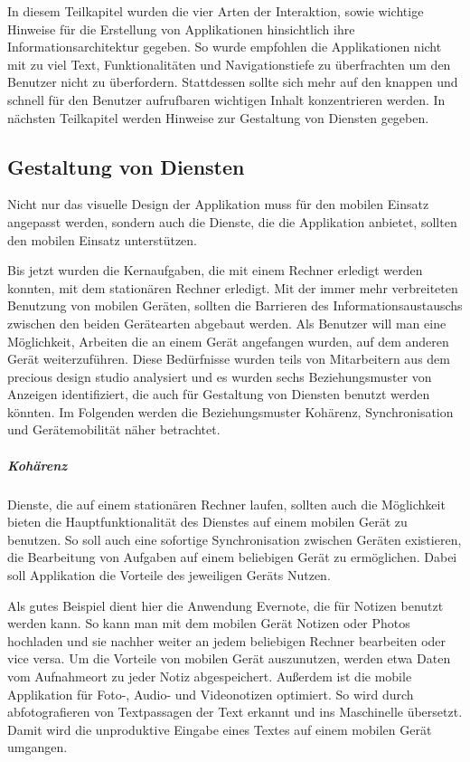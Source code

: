 In diesem Teilkapitel wurden die vier Arten der Interaktion, sowie wichtige Hinweise für die Erstellung von Applikationen hinsichtlich ihre Informationsarchitektur gegeben. So wurde empfohlen die Applikationen nicht mit zu viel Text, Funktionalitäten und Navigationstiefe zu überfrachten um den Benutzer nicht zu überfordern. Stattdessen sollte sich mehr auf den knappen und schnell für den Benutzer aufrufbaren wichtigen Inhalt konzentrieren werden. 
In nächsten Teilkapitel werden Hinweise zur Gestaltung von Diensten gegeben.

\subsection{Gestaltung von Diensten}
\label{sub:gestaltung_von_diensten}

Nicht nur das visuelle Design der Applikation muss für den mobilen Einsatz angepasst werden, sondern auch die Dienste, die die Applikation anbietet, sollten den mobilen Einsatz unterstützen. 

Bis jetzt wurden die Kernaufgaben, die mit einem Rechner erledigt werden konnten, mit dem stationären Rechner erledigt. Mit der immer mehr verbreiteten Benutzung von mobilen Geräten, sollten die Barrieren des Informationsaustauschs zwischen den beiden Gerätearten abgebaut werden. Als Benutzer will man eine Möglichkeit, Arbeiten die an einem Gerät angefangen wurden, auf dem anderen Gerät weiterzuführen. Diese Bedürfnisse wurden teils von Mitarbeitern aus dem precious design studio analysiert und es wurden sechs Beziehungsmuster von Anzeigen identifiziert, die auch für Gestaltung von Diensten benutzt werden könnten\cite{slideEcosystems}. Im Folgenden werden die Beziehungsmuster Kohärenz, Synchronisation und Gerätemobilität näher betrachtet.

\subparagraph{Kohärenz}

Dienste, die auf einem stationären Rechner laufen, sollten auch die Möglichkeit bieten die Hauptfunktionalität des Dienstes auf einem mobilen Gerät zu benutzen. So soll auch eine sofortige Synchronisation zwischen Geräten existieren, die  Bearbeitung von Aufgaben auf einem beliebigen Gerät zu ermöglichen. Dabei soll Applikation die Vorteile des jeweiligen Geräts Nutzen.

Als gutes Beispiel dient hier die Anwendung Evernote, die für Notizen benutzt werden kann. So kann man mit dem mobilen Gerät Notizen oder Photos hochladen und sie nachher weiter an jedem beliebigen Rechner bearbeiten oder vice versa. Um die Vorteile von mobilen Gerät auszunutzen, werden etwa Daten vom Aufnahmeort zu jeder Notiz abgespeichert. Außerdem ist die mobile Applikation für Foto-, Audio- und Videonotizen optimiert. So wird durch abfotografieren von Textpassagen der Text erkannt und ins Maschinelle übersetzt. Damit wird die unproduktive Eingabe eines Textes auf einem mobilen Gerät umgangen.

